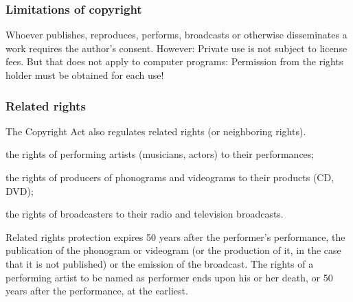 \subsubsection{Limitations of copyright}
Whoever publishes, reproduces, performs, broadcasts or otherwise disseminates a work requires the author’s consent. However: Private use is not subject to license fees. But that does not apply to computer programs: Permission from the rights holder must be obtained for each use!

\subsubsection{Related rights}
The Copyright Act also regulates related rights (or neighboring rights).
\begin{compactitem}
	\item the rights of performing artists (musicians, actors) to their performances;
	\item the rights of producers of phonograms and videograms to their products (CD, DVD);
	\item the rights of broadcasters to their radio and television broadcasts.
\end{compactitem}
Related rights protection expires 50 years after the performer’s performance, the publication of the phonogram or videogram (or the production of it, in the case that it is not published) or the emission of the broadcast. The rights of a performing artist to be named as performer ends upon his or her death, or 50 years after the performance, at the earliest.

